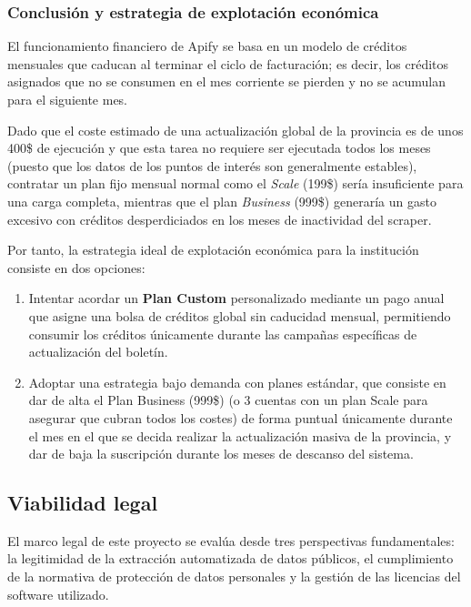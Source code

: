 \subsubsection{Conclusión y estrategia de explotación económica}
El funcionamiento financiero de Apify se basa en un modelo de créditos mensuales que caducan al terminar el ciclo de facturación; es decir, los créditos asignados que no se consumen en el mes corriente se pierden y no se acumulan para el siguiente mes. 

Dado que el coste estimado de una actualización global de la provincia es de unos 400\$ de ejecución y que esta tarea no requiere ser ejecutada todos los meses (puesto que los datos de los puntos de interés son generalmente estables), contratar un plan fijo mensual normal como el \textit{Scale} (199\$) sería insuficiente para una carga completa, mientras que el plan \textit{Business} (999\$) generaría un gasto excesivo con créditos desperdiciados en los meses de inactividad del scraper.

Por tanto, la estrategia ideal de explotación económica para la institución consiste en dos opciones:
\begin{enumerate}
    \item Intentar acordar un \textbf{Plan Custom} personalizado mediante un pago anual que asigne una bolsa de créditos global sin caducidad mensual, permitiendo consumir los créditos únicamente durante las campañas específicas de actualización del boletín.
    \item Adoptar una estrategia bajo demanda con planes estándar, que consiste en dar de alta el Plan Business (999\$) (o 3 cuentas con un plan Scale para asegurar que cubran todos los costes) de forma puntual únicamente durante el mes en el que se decida realizar la actualización masiva de la provincia, y dar de baja la suscripción durante los meses de descanso del sistema.
\end{enumerate}

\subsection{Viabilidad legal}
El marco legal de este proyecto se evalúa desde tres perspectivas fundamentales: la legitimidad de la extracción automatizada de datos públicos, el cumplimiento de la normativa de protección de datos personales y la gestión de las licencias del software utilizado.

